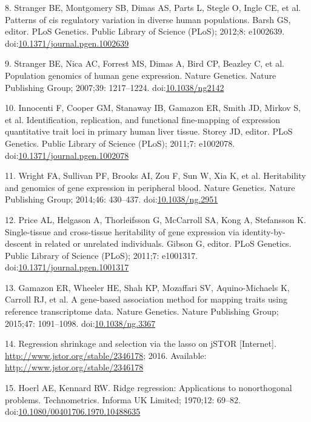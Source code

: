 \documentclass[]{article}
\begin{document}
8. Stranger BE, Montgomery SB, Dimas AS, Parts L, Stegle O, Ingle CE, et
al. Patterns of cis regulatory variation in diverse human populations.
Barsh GS, editor. PLoS Genetics. Public Library of Science (PLoS);
2012;8: e1002639.
doi:\href{http://dx.doi.org/10.1371/journal.pgen.1002639}{10.1371/journal.pgen.1002639}

9. Stranger BE, Nica AC, Forrest MS, Dimas A, Bird CP, Beazley C, et al.
Population genomics of human gene expression. Nature Genetics. Nature
Publishing Group; 2007;39: 1217--1224.
doi:\href{http://dx.doi.org/10.1038/ng2142}{10.1038/ng2142}

10. Innocenti F, Cooper GM, Stanaway IB, Gamazon ER, Smith JD, Mirkov S,
et al. Identification, replication, and functional fine-mapping of
expression quantitative trait loci in primary human liver tissue. Storey
JD, editor. PLoS Genetics. Public Library of Science (PLoS); 2011;7:
e1002078.
doi:\href{http://dx.doi.org/10.1371/journal.pgen.1002078}{10.1371/journal.pgen.1002078}

11. Wright FA, Sullivan PF, Brooks AI, Zou F, Sun W, Xia K, et al.
Heritability and genomics of gene expression in peripheral blood. Nature
Genetics. Nature Publishing Group; 2014;46: 430--437.
doi:\href{http://dx.doi.org/10.1038/ng.2951}{10.1038/ng.2951}

12. Price AL, Helgason A, Thorleifsson G, McCarroll SA, Kong A,
Stefansson K. Single-tissue and cross-tissue heritability of gene
expression via identity-by-descent in related or unrelated individuals.
Gibson G, editor. PLoS Genetics. Public Library of Science (PLoS);
2011;7: e1001317.
doi:\href{http://dx.doi.org/10.1371/journal.pgen.1001317}{10.1371/journal.pgen.1001317}

13. Gamazon ER, Wheeler HE, Shah KP, Mozaffari SV, Aquino-Michaels K,
Carroll RJ, et al. A gene-based association method for mapping traits
using reference transcriptome data. Nature Genetics. Nature Publishing
Group; 2015;47: 1091--1098.
doi:\href{http://dx.doi.org/10.1038/ng.3367}{10.1038/ng.3367}

14. Regression shrinkage and selection via the lasso on jSTOR
{[}Internet{]}. \url{http://www.jstor.org/stable/2346178}; 2016.
Available: \url{http://www.jstor.org/stable/2346178}

15. Hoerl AE, Kennard RW. Ridge regression: Applications to
nonorthogonal problems. Technometrics. Informa UK Limited; 1970;12:
69--82.
doi:\href{http://dx.doi.org/10.1080/00401706.1970.10488635}{10.1080/00401706.1970.10488635}
\end{document}
